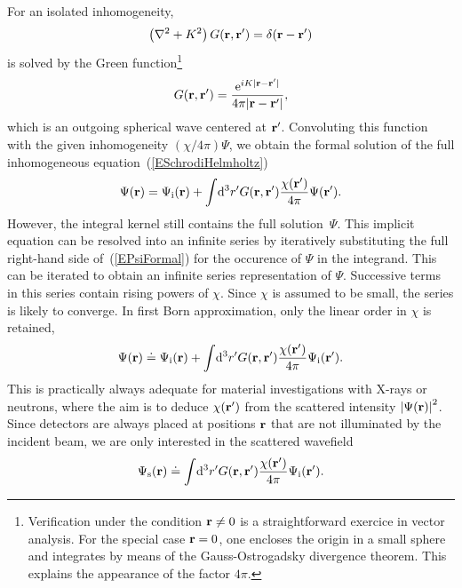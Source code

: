 For an isolated inhomogeneity,
\begin{equation}\label{EHelmholtzForGreen}
  \left(\mathbf{\nabla}^2+K^2\right)G(\mathbf{r},\mathbf{r}') = \delta(\mathbf{r}-\mathbf{r}')
\end{equation}
is solved by the Green function\footnote
{Verification under the condition $\mathbf{r}\ne0$
is a straightforward exercice in vector analysis.
For the special case $\mathbf{r}=0$,
one encloses the origin in a small sphere
and integrates by means of the Gauss-Ostrogadsky divergence theorem.
This explains the appearance of the factor $4\pi$.}
\begin{equation}\label{EGreens1}
  G(\mathbf{r},\mathbf{r}') = \frac{{\rm e}^{iK|\mathbf{r}-\mathbf{r}'|}}{4\pi |\mathbf{r}-\mathbf{r}'|},
\end{equation}
which is an outgoing spherical wave centered at $\mathbf{r}'$.
Convoluting this function with the given inhomogeneity $(\chi/4\pi)\Psi$,
we obtain the formal solution
of the full inhomogeneous equation~(\ref{ESchrodiHelmholtz})
\begin{equation}\label{EPsiFormal}
  \Psi(\mathbf{r})
  = \Psi_\text{i}(\mathbf{r})
  + \int\!{\rm d}^3r' G(\mathbf{r},\mathbf{r}')
                     \frac{\chi(\mathbf{r}')}{4\pi}\Psi(\mathbf{r}').
\end{equation}
However, the integral kernel still contains the full solution~$\Psi$.
This implicit equation
can be resolved into an infinite series
by iteratively substituting the full right-hand side of~(\ref{EPsiFormal})
for the occurence of $\Psi$ in the integrand.
This can be iterated to obtain an infinite series representation of $\Psi$.
Successive terms in this series contain rising powers of $\chi$.
Since $\chi$ is assumed to be small, the series is likely to converge.
In first Born approximation,
only the linear order in $\chi$ is retained,
\begin{equation}\label{EBorn}
  \Psi(\mathbf{r})
  \doteq \Psi_\text{i}(\mathbf{r})
  + \int\!{\rm d}^3r' G(\mathbf{r},\mathbf{r}')\frac{\chi(\mathbf{r}')}{4\pi}
   \Psi_\text{i}(\mathbf{r}').
\end{equation}
This is practically always adequate for
material investigations with X-rays or neutrons,
where the aim is to 
deduce $\chi(\mathbf{r}')$ from the scattered intensity ${|\Psi(\mathbf{r})|}^2$.
Since detectors are always placed at positions $\mathbf{r}$
that are not illuminated by the incident beam,
we are only interested in the scattered wavefield
\begin{equation}\label{EBornS}
  \Psi_\text{s}(\mathbf{r})
  \doteq 
  \int\!{\rm d}^3r' G(\mathbf{r},\mathbf{r}')\frac{\chi(\mathbf{r}')}{4\pi}\Psi_\text{i}(\mathbf{r}').
\end{equation}

